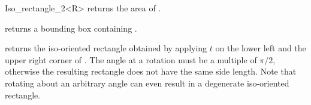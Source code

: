 \begin{ccRefClass} {Iso_rectangle_2<R>}
       {returns the area of \ccVar. }

       {returns a bounding box containing \ccVar. }

       {returns the iso-oriented rectangle obtained by applying $t$ on 
        the lower left and the upper right corner of \ccVar.
        \ccPrecond The angle at a rotation must be a multiple of $\pi/2$,
        otherwise the resulting rectangle does not have the same side length.
        Note that rotating about an arbitrary angle can even result in
        a degenerate  iso-oriented rectangle.}



\ccSeeAlso
{}

\end{ccRefClass} 
